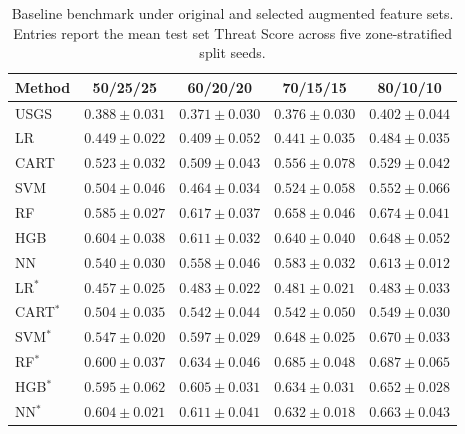 
\begin{table}[t!]
\centering
\caption{Baseline benchmark under original and selected augmented feature sets. Entries report the mean test set Threat Score across five zone-stratified split seeds.}
\label{tab:baseline_original_augmented_features}
\small
\setlength{\tabcolsep}{2pt}
\begin{tabularx}{\linewidth}{@{}Xcccc@{}}
\toprule
\textbf{Method} & \textbf{50/25/25} & \textbf{60/20/20} & \textbf{70/15/15} & \textbf{80/10/10} \\
\midrule
USGS~\cite{staley2016} 
& $0.388 \pm 0.031$ 
& $0.371 \pm 0.030$ 
& $0.376 \pm 0.030$ 
& $0.402 \pm 0.044$ \\
\midrule
LR~\cite{nikolopoulos2018pfdf_rf, kern2017ml_pfdf} 
& $0.449 \pm 0.022$ 
& $0.409 \pm 0.052$ 
& $0.441 \pm 0.035$ 
& $0.484 \pm 0.035$ \\
CART~\cite{kern2017ml_pfdf} 
& $0.523 \pm 0.032$ 
& $0.509 \pm 0.043$ 
& $0.556 \pm 0.078$ 
& $0.529 \pm 0.042$ \\
SVM~\cite{kern2017ml_pfdf} 
& $0.504 \pm 0.046$ 
& $0.464 \pm 0.034$ 
& $0.524 \pm 0.058$ 
& $0.552 \pm 0.066$ \\
RF~\cite{nikolopoulos2018pfdf_rf} 
& \underline{$0.585 \pm 0.027$} 
& $\bm{0.617 \pm 0.037}$ 
& $\bm{0.658 \pm 0.046}$ 
& $\bm{0.674 \pm 0.041}$ \\
HGB 
& $\bm{0.604 \pm 0.038}$ 
& \underline{$0.611 \pm 0.032$} 
& \underline{$0.640 \pm 0.040$} 
& \underline{$0.648 \pm 0.052$} \\
NN~\cite{kern2017ml_pfdf} 
& $0.540 \pm 0.030$ 
& $0.558 \pm 0.046$ 
& $0.583 \pm 0.032$ 
& $0.613 \pm 0.012$ \\
\midrule
LR$^{*}$ 
& $0.457 \pm 0.025$ 
& $0.483 \pm 0.022$ 
& $0.481 \pm 0.021$ 
& $0.483 \pm 0.033$ \\
CART$^{*}$ 
& $0.504 \pm 0.035$ 
& $0.542 \pm 0.044$ 
& $0.542 \pm 0.050$ 
& $0.549 \pm 0.030$ \\
SVM$^{*}$ 
& $0.547 \pm 0.020$ 
& \underline{$0.597 \pm 0.029$} 
& \underline{$0.648 \pm 0.025$} 
& \underline{$0.670 \pm 0.033$} \\
RF$^{*}$ 
& \underline{$0.600 \pm 0.037$} 
& $\bm{0.634 \pm 0.046}$ 
& $\bm{0.685 \pm 0.048}$ 
& $\bm{0.687 \pm 0.065}$ \\
HGB$^{*}$ 
& $0.595 \pm 0.062$ 
& $0.605 \pm 0.031$ 
& $0.634 \pm 0.031$ 
& $0.652 \pm 0.028$ \\
NN$^{*}$ 
& $\bm{0.604 \pm 0.021}$ 
& \underline{$0.611 \pm 0.041$} 
& $0.632 \pm 0.018$ 
& $0.663 \pm 0.043$ \\
\bottomrule
\end{tabularx}
\end{table}

